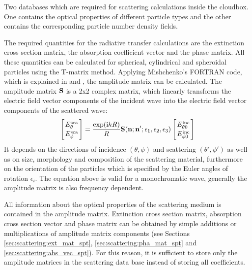 \label{sec:scattering:database}

Two databases which are required for scattering calculations inside
the cloudbox. One contains the optical properties of different
particle types and the other contains the corresponding particle
number density fields.

\label{sec:scattering:amp_mat_data}

The required quantities for the radiative transfer calculations are
the extinction cross section matrix, the absorption coefficient vector
and the phase matrix. All these quantities can be calculated for
spherical, cylindrical and spheroidal particles using the T-matrix
method. Applying Mishchenko's FORTRAN code, which is explained in
\citet{Mishchenko:98} and \citet{Mishchenko:00}, the amplitude matrix
can be calculated. The amplitude matrix ${\bf S}$ is a 2x2 complex
matrix, which linearly transforms the electric field vector components
of the incident wave into the electric field vector components of the
scattered wave:
\begin{eqnarray}
  \label{eq:ampl_matrix}
  \left[{E^{\rm sca}_{\theta}\atop E^{\rm sca}_{\phi}}\right] =
  \frac{\exp({\rm i} kR)}{R}{\bf S}({\bf n};{\bf
      n'};\epsilon_1,\epsilon_2,\epsilon_3)\left[{E^{\rm inc}_{\theta
          0}\atop E^{\rm inc}_{\phi 0}}\right] 
\end{eqnarray}
It depends on the directions of incidence $(\theta, \phi)$ and
scattering $(\theta', \phi')$ as well as on size, morphology and
composition of the scattering material, furthermore on the orientation
of the particles which is specified by the Euler angles of rotation
$\epsilon _i$.  The equation above is valid for a monochromatic wave,
generally the amplitude matrix is also frequency dependent.

All information about the optical properties of the scattering medium
is contained in the amplitude matrix. Extinction cross section matrix,
absorption cross section vector and phase matrix can be obtained by
simple additions or multiplications of amplitude matrix components
(see Sections \ref{sec:scattering:ext_mat_spt},
\ref{sec:scattering:pha_mat_spt} and
\ref{sec:scattering:abs_vec_spt}).  For this reason, it is sufficient
to store only the amplitude matrices in the scattering data base
instead of storing all coefficients.

